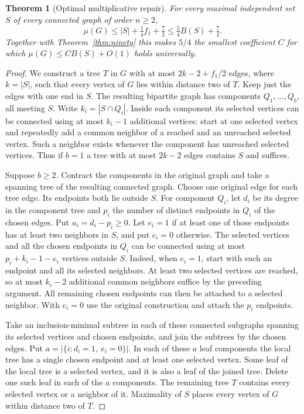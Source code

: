 \documentclass[11pt,a4paper]{article}
\newtheorem{theorem}{Theorem}[section]
\theoremstyle{remark}\newtheorem*{remark}{Remark}
\begin{document}
\begin{theorem}[Optimal multiplicative repair]\label{thm:ninety-optimal}
For every maximal independent set $S$ of every connected graph of
order $n\ge2$,
\[
 \mu(G)\le |S|+\tfrac14 f_1+\tfrac72
          \le \tfrac54 B(S)+\tfrac72 .
\]
Together with Theorem~\ref{thm:ninety} this makes $5/4$ the smallest
coefficient $C$ for which $\mu(G)\le CB(S)+O(1)$ holds universally.
\end{theorem}
\begin{proof}
We construct a tree $T$ in $G$ with at most $2k-2+f_1/2$ edges,
where $k=|S|$, such that every vertex of $G$ lies within distance two
of $T$. Keep just the edges with one end in $S$. The resulting
bipartite graph has components $Q_1,\ldots,Q_b$, all meeting $S$.
Write $k_i=|S\cap Q_i|$. Inside each component its selected vertices
can be connected using at most $k_i-1$ additional vertices: start at
one selected vertex and repeatedly add a common neighbor of a reached
and an unreached selected vertex. Such a neighbor exists whenever
the component has unreached selected vertices. Thus if $b=1$ a tree
with at most $2k-2$ edges contains $S$ and suffices.

Suppose $b\ge2$. Contract the components in the original graph and
take a spanning tree of the resulting connected graph. Choose one
original edge for each tree edge. Its endpoints both lie outside $S$.
For component $Q_i$, let $d_i$ be its degree in the component tree
and $p_i$ the number of distinct endpoints in $Q_i$ of the chosen
edges. Put $u_i=d_i-p_i\ge0$. Let $e_i=1$ if at least one of those
endpoints has at least two neighbors in $S$, and put $e_i=0$ otherwise.
The selected vertices and all the chosen endpoints in $Q_i$ can be
connected using at most $p_i+k_i-1-e_i$ vertices outside $S$.
Indeed, when $e_i=1$, start with such an endpoint and all its selected
neighbors. At least two selected vertices are reached, so at most
$k_i-2$ additional common neighbors suffice by the preceding argument.
All remaining chosen endpoints can then be attached to a selected
neighbor. With $e_i=0$ use the original construction and attach the
$p_i$ endpoints.

Take an inclusion-minimal subtree in each of these connected subgraphs
spanning its selected vertices and chosen endpoints, and join the
subtrees by the chosen edges. Put $a=|\{i:d_i=1,\ e_i=0\}|$.
In each of these $a$ leaf components the local tree has a single
chosen endpoint and at least one selected vertex. Some leaf of the
local tree is a selected vertex, and it is also a leaf of the joined
tree. Delete one such leaf in each of the $a$ components. The
remaining tree $T$ contains every selected vertex or a neighbor of
it. Maximality of $S$ places every vertex of $G$ within distance two
of $T$.


\end{proof}
\end{document}

